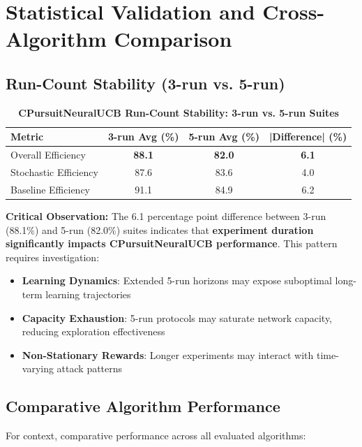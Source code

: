 \documentclass[12pt,a4paper]{article}
\newcommand{\critical}[1]{\textcolor{criticalcolor}{\textbf{#1}}}
\newcommand{\success}[1]{\textcolor{successcolor}{\textbf{#1}}}
\begin{document}
\section{Statistical Validation and Cross-Algorithm Comparison}

\subsection{Run-Count Stability (3-run vs. 5-run)}

\begin{table}[H]
\centering
\caption{\success{CPursuitNeuralUCB Run-Count Stability: 3-run vs. 5-run Suites}}
\begin{tabular}{|l|c|c|c|}
\hline
\textbf{Metric} & \textbf{3-run Avg (\%)} & \textbf{5-run Avg (\%)} & \textbf{|Difference| (\%)} \\
\hline
\hline
Overall Efficiency & \success{88.1} & \success{82.0} & \success{6.1} \\
Stochastic Efficiency & 87.6 & 83.6 & 4.0 \\
Baseline Efficiency & 91.1 & 84.9 & 6.2 \\
\hline
\end{tabular}
\end{table}

\textbf{Critical Observation:} The 6.1 percentage point difference between 3-run (88.1\%) and 5-run (82.0\%) suites indicates that \critical{experiment duration significantly impacts CPursuitNeuralUCB performance}. This pattern requires investigation:

\begin{itemize}
\item \critical{Learning Dynamics}: Extended 5-run horizons may expose suboptimal long-term learning trajectories
\item \critical{Capacity Exhaustion}: 5-run protocols may saturate network capacity, reducing exploration effectiveness
\item \critical{Non-Stationary Rewards}: Longer experiments may interact with time-varying attack patterns
\end{itemize}

\subsection{Comparative Algorithm Performance}

For context, comparative performance across all evaluated algorithms:
\end{document}
